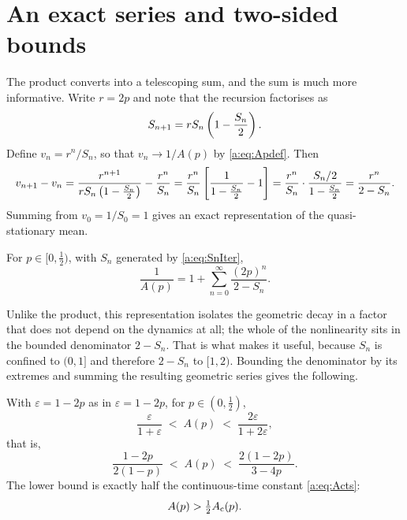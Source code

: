 \section{An exact series and two-sided bounds}
\label{a:sec:Abounds}

The product converts into a telescoping sum, and the sum is much more informative.
Write $r=2p$ and note that the recursion factorises as
\begin{equation*}
S_{n+1} = rS_n\left(1-\frac{S_n}{2}\right) .
\end{equation*}
Define $v_n = r^n/S_n$, so that $v_n\to1/A(p)$ by \cref{a:eq:Apdef}. Then
\begin{equation*}
v_{n+1}-v_n
= \frac{r^{n+1}}{rS_n\left(1-\frac{S_n}{2}\right)} - \frac{r^n}{S_n}
= \frac{r^n}{S_n}\left[\frac{1}{1-\frac{S_n}{2}}-1\right]
= \frac{r^n}{S_n}\cdot\frac{S_n/2}{1-\frac{S_n}{2}}
= \frac{r^n}{2-S_n} .
\end{equation*}
Summing from $v_0 = 1/S_0 = 1$ gives an exact representation of the
quasi-stationary mean.

\begin{proposition}
\label{a:prop:series}
For $p\in[0,\tfrac12)$, with $S_n$ generated by \cref{a:eq:SnIter},
\begin{equation}
\label{a:eq:Aseries}
\frac{1}{A(p)} = 1 + \sum_{n=0}^{\infty}\frac{(2p)^n}{2-S_n} .
\end{equation}
\end{proposition}

\noindent
Unlike the product, this representation isolates the geometric decay in a factor
that does not depend on the dynamics at all; the whole of the nonlinearity sits in
the bounded denominator $2-S_n$. That is what makes it useful, because $S_n$ is
confined to $(0,1]$ and therefore $2-S_n$ to $[1,2)$. Bounding the denominator by
its extremes and summing the resulting geometric series gives the following.

\begin{proposition}
\label{a:prop:bounds}
With $\varepsilon=1-2p$ as in $\varepsilon=1-2p$, for $p\in(0,\tfrac12)$,
\begin{equation}
\label{a:eq:Abounds}
\frac{\varepsilon}{1+\varepsilon} \;<\; A(p) \;<\; \frac{2\varepsilon}{1+2\varepsilon},
\end{equation}
that is,
\begin{equation}
\label{a:eq:Aboundsexplicit}
\frac{1-2p}{2(1-p)} \;<\; A(p) \;<\; \frac{2(1-2p)}{3-4p} .
\end{equation}
The lower bound is exactly half the continuous-time constant \cref{a:eq:Acts}:
\begin{equation}
\label{a:eq:halfAc}
A(p) > \tfrac12A_{\mathrm{c}}(p) .
\end{equation}
\end{proposition}

